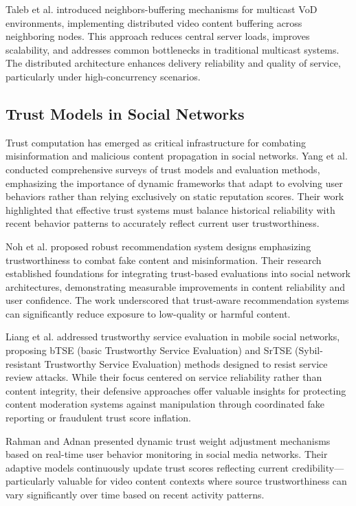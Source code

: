 \documentclass[conference]{IEEEtran}
\begin{document}
Taleb et al. \cite{taleb2003neighbors} introduced neighbors-buffering mechanisms for multicast VoD environments, implementing distributed video content buffering across neighboring nodes. This approach reduces central server loads, improves scalability, and addresses common bottlenecks in traditional multicast systems. The distributed architecture enhances delivery reliability and quality of service, particularly under high-concurrency scenarios.

\subsection{Trust Models in Social Networks}

Trust computation has emerged as critical infrastructure for combating misinformation and malicious content propagation in social networks. Yang et al. \cite{yang2012advance} conducted comprehensive surveys of trust models and evaluation methods, emphasizing the importance of dynamic frameworks that adapt to evolving user behaviors rather than relying exclusively on static reputation scores. Their work highlighted that effective trust systems must balance historical reliability with recent behavior patterns to accurately reflect current user trustworthiness.

Noh et al. \cite{noh2015toward} proposed robust recommendation system designs emphasizing trustworthiness to combat fake content and misinformation. Their research established foundations for integrating trust-based evaluations into social network architectures, demonstrating measurable improvements in content reliability and user confidence. The work underscored that trust-aware recommendation systems can significantly reduce exposure to low-quality or harmful content.

Liang et al. \cite{liang2014enabling} addressed trustworthy service evaluation in mobile social networks, proposing bTSE (basic Trustworthy Service Evaluation) and SrTSE (Sybil-resistant Trustworthy Service Evaluation) methods designed to resist service review attacks. While their focus centered on service reliability rather than content integrity, their defensive approaches offer valuable insights for protecting content moderation systems against manipulation through coordinated fake reporting or fraudulent trust score inflation.

Rahman and Adnan \cite{rahman2016dynamic} presented dynamic trust weight adjustment mechanisms based on real-time user behavior monitoring in social media networks. Their adaptive models continuously update trust scores reflecting current credibility—particularly valuable for video content contexts where source trustworthiness can vary significantly over time based on recent activity patterns.
\end{document}
